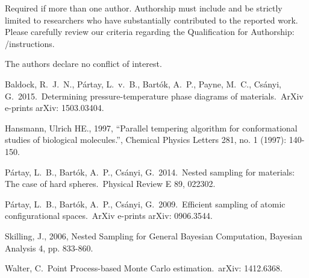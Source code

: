 \documentclass[journal,article,accept,moreauthors,pdftex,12pt,a4paper]{mdpi}
\begin{document}

Required if more than one author. Authorship must include and be strictly limited to researchers who have substantially contributed to the reported work. Please carefully review our criteria regarding the Qualification for Authorship: \web /instructions.


The authors declare no conflict of interest.


\makeatletter
\renewcommand\@biblabel[1]{#1. }
\makeatother

\begin{thebibliography}{999} %

 Baldock, R.~J.~N., 
P{\'a}rtay, L.~v.~B., Bart{\'o}k, A.~P., Payne, M.~C., Cs{\'a}nyi, G.\ 
2015.\ Determining pressure-temperature phase diagrams of materials.\ ArXiv 
e-prints arXiv: 1503.03404. 

 Hansmann, Ulrich HE., 1997, ``Parallel tempering algorithm for conformational studies of biological molecules.'', Chemical Physics Letters 281, no. 1 (1997): 140-150.

 P{\'a}rtay, L.~B., 
Bart{\'o}k, A.~P., Cs{\'a}nyi, G.\ 2014.\ Nested sampling for materials: 
The case of hard spheres.\ Physical Review E 89, 022302. 

 P{\'a}rtay, L.~B., 
Bart{\'o}k, A.~P., Cs{\'a}nyi, G.\ 2009.\ Efficient sampling of atomic 
configurational spaces.\ ArXiv e-prints arXiv: 0906.3544. 

 Skilling, J., 2006, Nested Sampling for General Bayesian Computation, Bayesian Analysis 4, pp. 833-860.

Walter, C.\ Point Process-based Monte Carlo estimation.\ arXiv: 1412.6368.


\end{thebibliography}
\end{document}
